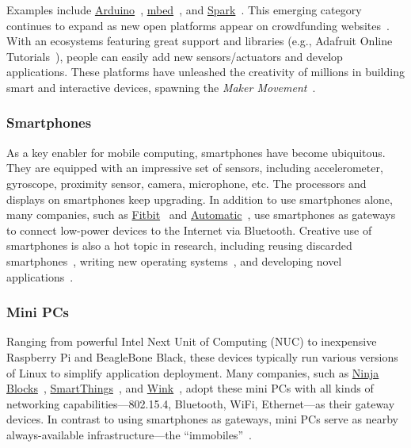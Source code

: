 Examples include \href{http://www.arduino.cc/}{Arduino}~\cite{arduino},
\href{https://www.mbed.com/}{mbed}~\cite{mbed}, and
\href{https://www.spark.io/}{Spark}~\cite{spark}. This emerging category
continues to expand as new open platforms appear on crowdfunding
websites~\cite{kickstarter}.  With an ecosystems featuring great support and
libraries (e.g., Adafruit Online Tutorials~\cite{adafruit}), people can easily
add new sensors/actuators and develop applications. These platforms have
unleashed the creativity of millions in building smart and interactive devices,
spawning the \textit{Maker Movement}~\cite{dougherty2012maker}.

\subsubsection{Smartphones}

As a key enabler for mobile computing, smartphones have become ubiquitous. They
are equipped with an impressive set of sensors, including accelerometer,
gyroscope, proximity sensor, camera, microphone, etc. The processors and
displays on smartphones keep upgrading. In addition to use smartphones alone,
many companies, such as \href{https://www.fitbit.com/}{Fitbit}~\cite{fitbit} and
\href{https://www.automatic.com/}{Automatic}~\cite{automatic}, use smartphones
as gateways to connect low-power devices to the Internet via Bluetooth. Creative
use of smartphones is also a hot topic in research, including reusing discarded
smartphones~\cite{challen2014mote}, writing new operating systems~\cite{janos},
and developing novel applications~\cite{hong2014smartphone}.

\subsubsection{Mini PCs}

Ranging from powerful Intel Next Unit of Computing (NUC) to inexpensive
Raspberry Pi and BeagleBone Black, these devices typically run various versions
of Linux to simplify application deployment. Many companies, such as
\href{https://ninjablocks.com/}{Ninja Blocks}~\cite{ninja},
\href{https://www.smartthings.com/}{SmartThings}~\cite{smartthings}, and
\href{https://www.wink.com/}{Wink}~\cite{wink}, adopt these mini PCs with all
kinds of networking capabilities---802.15.4, Bluetooth, WiFi, Ethernet---as
their gateway devices.  In contrast to using smartphones as gateways, mini PCs
serve as nearby always-available infrastructure---the
``immobiles''~\cite{swarmbox}.


